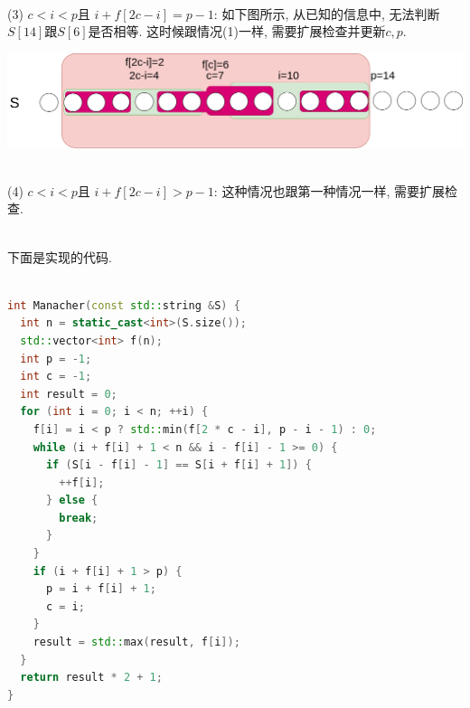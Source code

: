 \documentclass{article}
\begin{document}
~\\
(3) $c<i<p$且 $i+f[2c-i]= p-1$: 如下图所示, 从已知的信息中, 无法判断$S[14]$跟$S[6]$是否相等. 这时候跟情况(1)一样, 需要扩展检查并更新$c,p$. \par
\includegraphics[scale=0.39]{pic3.png} \par
~\\
(4) $c<i<p$且 $i+f[2c-i]> p-1$: 这种情况也跟第一种情况一样, 需要扩展检查. \par
~\\
下面是实现的代码.
\begin{lstlisting}[language=C++, caption={Manacher}]

int Manacher(const std::string &S) {
  int n = static_cast<int>(S.size());
  std::vector<int> f(n);
  int p = -1;
  int c = -1;
  int result = 0;
  for (int i = 0; i < n; ++i) {
    f[i] = i < p ? std::min(f[2 * c - i], p - i - 1) : 0;
    while (i + f[i] + 1 < n && i - f[i] - 1 >= 0) {
      if (S[i - f[i] - 1] == S[i + f[i] + 1]) {
        ++f[i];
      } else {
        break;
      }
    }
    if (i + f[i] + 1 > p) {
      p = i + f[i] + 1;
      c = i;
    }
    result = std::max(result, f[i]);
  }
  return result * 2 + 1;
}
\end{lstlisting}
\end{document}
